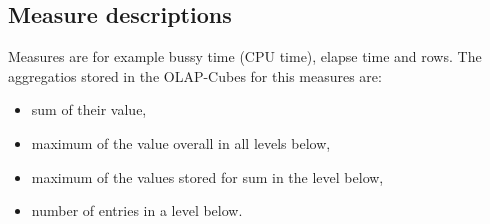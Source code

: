 \subsection{Measure descriptions}
Measures are for example bussy time (CPU time), elapse time and rows. The aggregatios stored in the
OLAP-Cubes for this measures are:
\begin{itemize}
 \item sum of their value,
 \item maximum of the value overall in all levels below,
 \item maximum of the values stored for sum in the level below,
 \item number of entries in a level below.
\end{itemize}



  
